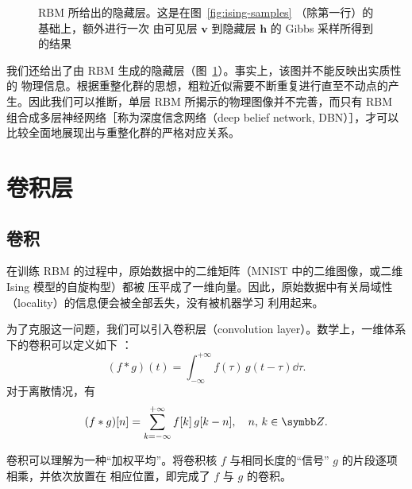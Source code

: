\begin{figure}[htb]
  \centering
  \caption{RBM 所给出的隐藏层。这是在图~\ref{fig:ising-samples} （除第一行）的基础上，额外进行一次
    由可见层 $\bm{v}$ 到隐藏层 $\bm{h}$ 的 Gibbs 采样所得到的结果}
  \label{fig:ising-hidden}
\end{figure}

我们还给出了由 RBM 生成的隐藏层（图~\ref{fig:ising-hidden}）。事实上，该图并不能反映出实质性的
物理信息。根据重整化群的思想，粗粒近似需要不断重复进行直至不动点的产生。因此我们可以推断，单层 RBM
所揭示的物理图像并不完善，而只有 RBM 组合成多层神经网络［称为深度信念网络（deep belief network,
DBN）］\cite{exact}，才可以比较全面地展现出与重整化群的严格对应关系。

\section{卷积层}

\subsection{卷积}

在训练 RBM 的过程中，原始数据中的二维矩阵（MNIST 中的二维图像，或二维 Ising 模型的自旋构型）都被
压平成了一维向量。因此，原始数据中有关局域性（locality）的信息便会被全部丢失，没有被机器学习
利用起来。

为了克服这一问题，我们可以引入卷积层（convolution layer）。数学上，一维体系下的卷积可以定义如下
\cite{wiki:convolution}：
\begin{equation}
  \label{eq:convolution-continuous}
  (f \ast g) (t) = \int_{-\infty}^{+\infty} f(\tau) \, g(t-\tau) \dd{\tau}.
\end{equation}
对于离散情况，有
\begin{equation}
  (f \ast g) [n] = \sum_{k=-\infty}^{+\infty} f[k] \, g[k-n] \qc n,\,k \in \Z.
\end{equation}

卷积可以理解为一种“加权平均”。将卷积核 $f$ 与相同长度的“信号” $g$ 的片段逐项相乘，并依次放置在
相应位置，即完成了 $f$ 与 $g$ 的卷积。

